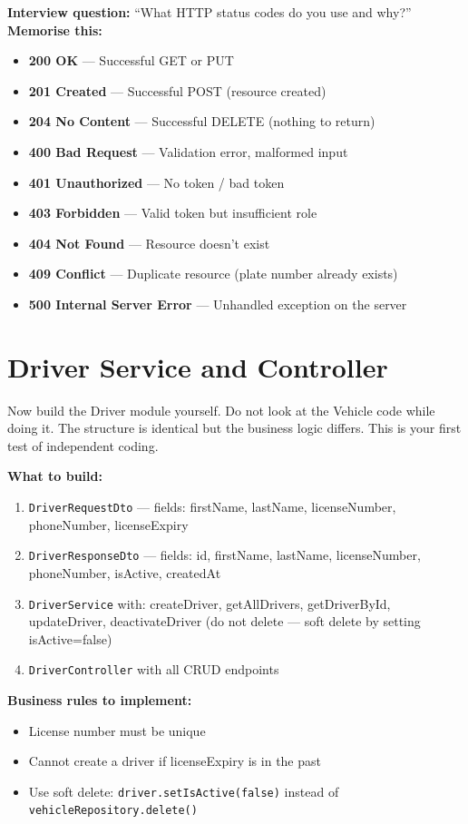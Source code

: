 \documentclass[12pt,a4paper]{report}
\newcommand{\code}[1]{\texttt{\textcolor{keywordblue}{#1}}}
\begin{document}
\begin{tcolorbox}[interviewbox]
\textbf{Interview question:} ``What HTTP status codes do you use and why?''\\[6pt]
\textbf{Memorise this:}
\begin{itemize}
  \item \textbf{200 OK} --- Successful GET or PUT
  \item \textbf{201 Created} --- Successful POST (resource created)
  \item \textbf{204 No Content} --- Successful DELETE (nothing to return)
  \item \textbf{400 Bad Request} --- Validation error, malformed input
  \item \textbf{401 Unauthorized} --- No token / bad token
  \item \textbf{403 Forbidden} --- Valid token but insufficient role
  \item \textbf{404 Not Found} --- Resource doesn't exist
  \item \textbf{409 Conflict} --- Duplicate resource (plate number already exists)
  \item \textbf{500 Internal Server Error} --- Unhandled exception on the server
\end{itemize}
\end{tcolorbox}

\section{Driver Service and Controller}

\begin{tcolorbox}[handbox]
Now build the Driver module yourself. Do not look at the Vehicle code while doing it. The structure is identical but the business logic differs. This is your first test of independent coding.

\textbf{What to build:}
\begin{enumerate}
  \item \code{DriverRequestDto} --- fields: firstName, lastName, licenseNumber, phoneNumber, licenseExpiry
  \item \code{DriverResponseDto} --- fields: id, firstName, lastName, licenseNumber, phoneNumber, isActive, createdAt
  \item \code{DriverService} with: createDriver, getAllDrivers, getDriverById, updateDriver, deactivateDriver (do not delete --- soft delete by setting isActive=false)
  \item \code{DriverController} with all CRUD endpoints
\end{enumerate}

\textbf{Business rules to implement:}
\begin{itemize}
  \item License number must be unique
  \item Cannot create a driver if licenseExpiry is in the past
  \item Use soft delete: \code{driver.setIsActive(false)} instead of \code{vehicleRepository.delete()}
\end{itemize}
\end{tcolorbox}
\end{document}
